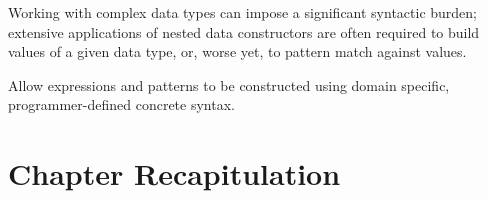 \documentclass[thesis-solanki.tex]{subfiles}
\begin{document}
Working with complex data types can impose a significant syntactic burden; extensive applications of nested data constructors are often 
required to build values of a given data type, or, worse yet, to pattern match against values.

Allow  expressions and patterns to be constructed using domain specific, programmer-defined concrete syntax.


\section{Chapter Recapitulation}

\ifMain
\begin{scope}
  \nolinenumbers
  \enotesize
  \par
  \begin{singlespace}
  \setlength{\parskip}{12pt plus 2pt minus 1pt}
  \theendnotes
  \par
  \end{singlespace}
\end{scope}
\fi
\end{document}
